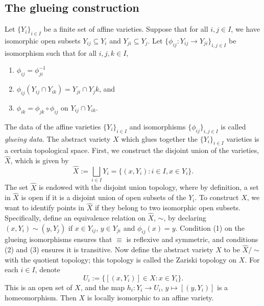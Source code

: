 \subsection{The glueing construction}
Let $\{Y_i\}_{i\in I}$ be a finite set of affine varieties.
Suppose that for all $i, j \in I$, we have isomorphic open subsets $Y_{ij} \subseteq Y_i$ and $Y_{ji} \subseteq Y_j$.
Let $\{\phi_{ij} : Y_{ij} \to Y_{ji}\}_{i, j \in I}$ be isomorphism such that for all $i, j, k \in I$,
\begin{enumerate}
\item
$\phi_{ij} = \phi_{ji}^{-1}$

\item
$\phi_{ij}(Y_{ij} \cap Y_{ik}) = Y_{ji} \cap Y_jk$, and

\item
$\phi_{ik} = \phi_{jk} \circ \phi_{ij}$ on $Y_{ij} \cap Y_{ik}$.
\end{enumerate}
The data of the affine varieties $\{Y_i\}_{i\in I}$ and isomorphisms $\{\phi_{ij}\}_{i,j\in I}$ is called \emph{glueing data}.
The abstract variety $X$ which glues together the $\{Y_i\}_{i\in I}$ varieties is a certain topological space.
First, we construct the disjoint union of the varieties, $\hat X$, which is given by
$$\hat X := \bigsqcup_{i \in I} Y_i = \{(x, Y_i) : i \in I, x \in Y_i\}.$$
The set $\hat X$ is endowed with the disjoint union topology, where by definition, a set in $\hat X$ is open if it is a disjoint union of open subsets of the $Y_i$.
To construct $X$, we want to identify points in $\hat X$ if they belong to two isomorphic open subsets.
Specifically, define an equivalence relation on $\hat X$, $\sim$, by declaring $(x, Y_i) \sim (y, Y_j)$ if $x \in Y_{ij}$, $y\in Y_{ji}$ and $\phi_{ij}(x) = y$.
Condition (1) on the glueing isomorphisms ensures that $\equiv$ is reflexive and symmetric, and conditions (2) and (3) ensures it is transitive.
Now define the abstract variety $X$ to be $\hat X / \sim$ with the quotient topology;
this topology is called the Zariski topology on $X$.
For each $i \in I$, denote
$$U_i := \{[(x, Y_i)] \in X : x \in Y_i\}.$$
This is an open set of $X$, and the map $h_i : Y_i \to U_i$, $y \mapsto [(y, Y_i)]$ is a homeomorphism.
Then $X$ is locally isomorphic to an affine variety.

